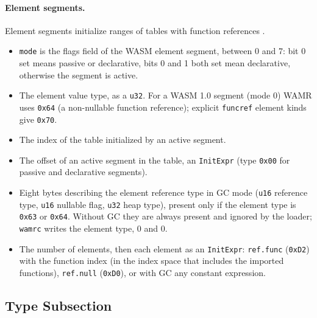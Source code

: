 \documentclass{article}
\begin{document}
\paragraph{Element segments.}
Element segments initialize ranges of tables with function references \cite[Sec.~5.5.12]{webassembly2019core}.
\begin{itemize}
    \item \verb|mode| is the flags field of the WASM element segment, between 0 and 7: bit 0 set means passive or declarative, bits 0 and 1 both set mean declarative, otherwise the segment is active.
    \item The element value type, as a \verb|u32|. For a WASM 1.0 segment (mode 0) WAMR uses \verb|0x64| (a non-nullable function reference); explicit \verb|funcref| element kinds give \verb|0x70|.
    \item The index of the table initialized by an active segment.
    \item The offset of an active segment in the table, an \verb|InitExpr| (type \verb|0x00| for passive and declarative segments).
    \item Eight bytes describing the element reference type in GC mode (\verb|u16| reference type, \verb|u16| nullable flag, \verb|u32| heap type), present only if the element type is \verb|0x63| or \verb|0x64|.
        Without GC they are always present and ignored by the loader; \texttt{wamrc} writes the element type, 0 and 0.
    \item The number of elements, then each element as an \verb|InitExpr|: \verb|ref.func| (\verb|0xD2|) with the function index (in the index space that includes the imported functions), \verb|ref.null| (\verb|0xD0|), or with GC any constant expression.
\end{itemize}

\subsection{Type Subsection}
\end{document}
